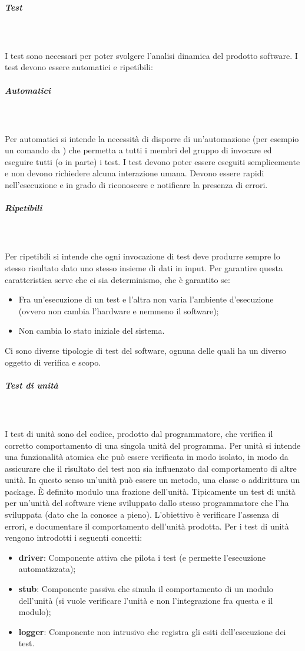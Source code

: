 \subparagraph{Test} \mbox{}\\ \\
I test sono necessari per poter svolgere l'analisi dinamica del prodotto software.
I test devono essere automatici e ripetibili:
\subparagraph*{Automatici} \mbox{}\\ \\
Per automatici si intende la necessità di disporre di un'automazione (per esempio un comando da ) che permetta a tutti i membri del gruppo di invocare ed eseguire tutti (o in parte) i test.
I test devono poter essere eseguiti semplicemente e non devono richiedere alcuna interazione umana.
Devono essere rapidi nell’esecuzione e in grado di riconoscere e notificare la presenza di errori.
\subparagraph*{Ripetibili} \mbox{}\\ \\
Per ripetibili si intende che ogni invocazione di test deve produrre sempre lo stesso risultato dato uno stesso insieme di dati in input.
Per garantire questa caratteristica serve che ci sia determinismo, che è garantito se:
\begin{itemize}
    \item Fra un'esecuzione di un test e l'altra non varia l'ambiente d'esecuzione (ovvero non cambia l'hardware e nemmeno il software);
    \item Non cambia lo stato iniziale del sistema.
\end{itemize}

Ci sono diverse tipologie di test del software, ognuna delle quali ha un diverso oggetto di verifica e scopo.

\subparagraph{Test di unità} \mbox{}\\ \\
I test di unità sono del codice, prodotto dal programmatore, che verifica il corretto comportamento di una singola unità del programma.
Per unità si intende una funzionalità atomica che può essere verificata in modo isolato, in modo da assicurare che il risultato del test non sia influenzato dal comportamento di altre unità. In questo senso un'unità può essere un metodo, una classe o addirittura un package.
È definito modulo una frazione dell'unità.
Tipicamente un test di unità per un'unità del software viene sviluppato dallo stesso programmatore che l'ha sviluppata (dato che la conosce a pieno).
L'obiettivo è verificare l’assenza di errori, e documentare il comportamento dell’unità prodotta.
Per i test di unità vengono introdotti i seguenti concetti:
\begin{itemize}
    \item \textbf{driver}: Componente attiva che pilota i test (e permette l'esecuzione automatizzata);
    \item \textbf{stub}: Componente passiva che simula il comportamento di un modulo dell'unità (si vuole verificare l'unità e non l'integrazione fra questa e il modulo);
    \item \textbf{logger}: Componente non intrusivo che registra gli esiti dell'esecuzione dei test.
\end{itemize}

